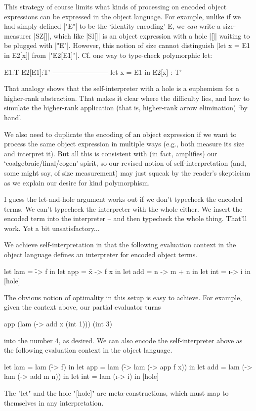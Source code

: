 \documentclass[preprint]{sigplanconf}
\begin{document}
This strategy of course limits what kinds of processing on encoded
object expressions can be expressed in the object language.  For
example, unlike if we had simply defined |"E"| to be the `identity
encoding' E, we \emph{can} write a size-measurer |SZ[]|, which like |SI[]| is
an object expression with a hole |[]| waiting to be plugged with |"E"|.
However, this notion of size cannot distinguish |let x = E1 in E2[x]|
from |"E2[E1]"|.  Cf. one way to type-check polymorphic let:
\begin{code}
        E1:T    E2[E1]:T'
    ------------------------
    let x = E1 in E2[x] : T'
\end{code}
That analogy shows that the self-interpreter with a hole is a
euphemism for a higher-rank abstraction. That makes it clear where
the difficulty lies, and how to simulate the higher-rank application
(that is, higher-rank arrow elimination) `by hand'.


We also need to duplicate the encoding of an object expression if we
want to process the same object expression in multiple ways (e.g., both
measure its size and interpret it).  But all this is consistent with (in
fact, amplifies) our `coalgebraic/final/cogen' spirit, so our revised
notion of self-interpretation (and, some might say, of size measurement)
may just squeak by the reader's skepticism as we explain our desire for
kind polymorphism.

I guess the let-and-hole argument works out if we don't typecheck the
encoded terms. We can't typecheck the interpreter with the whole
either. We insert the encoded term into the interpreter -- and then
typecheck the whole thing. That'll work. Yet a bit unsatisfactory...


We achieve
self-interpretation in that the following evaluation context in the
object language defines an interpreter for encoded object terms.
\begin{code}
  let lam = \f -> f in
  let app = \f x -> f x in
  let add = \m n -> m + n in
  let int = \i -> i in
  [hole]
\end{code}
The obvious notion of optimality in this setup is easy to achieve.  For
example, given the context above, our partial evaluator turns
\begin{code}
  app (lam (\x -> add x (int 1))) (int 3)
\end{code}
into the number 4, as desired.  We can also encode the self-interpreter
above as the following evaluation context in the object language.
\begin{code}
  let lam = lam (\f -> f) in
  let app = lam (\f -> lam (\x -> app f x)) in
  let add = lam (\m -> lam (\n -> add m n)) in
  let int = lam (\i -> i) in
  [hole]
\end{code}
The "let" and the hole "[hole]" are meta-constructions, which must map to
themselves in any interpretation.  
\end{document}
